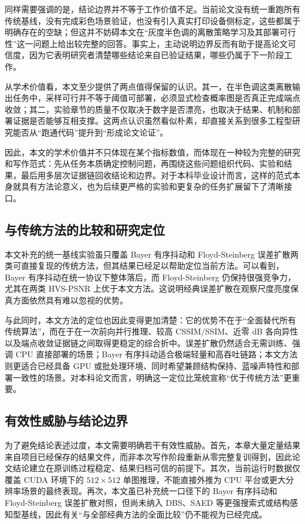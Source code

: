 \documentclass[thesis]{../zstucs-graduation-project}
\begin{document}
同样需要强调的是，结论边界并不等于工作价值不足。当前论文没有统一重跑所有传统基线，没有完成彩色场景验证，也没有引入真实打印设备侧标定，这些都属于明确存在的空缺；但这并不妨碍本文在“灰度半色调的离散策略学习及其部署可行性”这一问题上给出较完整的回答。事实上，主动说明边界反而有助于提高论文可信度，因为它表明研究者清楚哪些结论来自已验证结果，哪些仍属于下一阶段工作。

从学术价值看，本文至少提供了两点值得保留的认识。其一，在半色调这类离散输出任务中，采样可行并不等于阈值可部署，必须显式检查概率图是否真正完成端点收敛；其二，实验章节的质量不仅取决于数字是否漂亮，也取决于结果、机制和部署证据是否能够互相支撑。这两点认识虽然看似朴素，却直接关系到很多工程型研究能否从“跑通代码”提升到“形成论文论证”。

因此，本文的学术价值并不只体现在某个指标数值，而体现在一种较为完整的研究和写作范式：先从任务本质确定控制问题，再围绕这些问题组织代码、实验和结果，最后用多层次证据链回收结论和边界。对于本科毕业设计而言，这样的范式本身就具有方法论意义，也为后续更严格的实验和更复杂的任务扩展留下了清晰接口。

\subsection{与传统方法的比较和研究定位}
本文补充的统一基线实验虽只覆盖 Bayer 有序抖动和 Floyd-Steinberg 误差扩散两类可直接复现的传统方法，但其结果已经足以帮助定位当前方法。可以看到，Bayer 有序抖动在统一协议下整体落后，而 Floyd-Steinberg 仍保持很强竞争力，尤其在两类 HVS-PSNR 上优于本文方法。这说明经典误差扩散在观察尺度亮度保真方面依然具有难以忽视的优势。

与此同时，本文方法的定位也因此变得更加清楚：它的优势不在于“全面替代所有传统算法”，而在于在一次前向并行推理、较高 CSSIM/SSIM、近零 dB 各向异性以及端点收敛证据链之间取得更稳定的综合折中。误差扩散仍然适合无需训练、强调 CPU 直接部署的场景；Bayer 有序抖动适合极端轻量和高吞吐链路；本文方法则更适合已经具备 GPU 或批处理环境、同时希望兼顾结构保持、蓝噪声特性和部署一致性的场景。对本科论文而言，明确这一定位比笼统宣称“优于传统方法”更重要。

\subsection{有效性威胁与结论边界}
为了避免结论表述过度，本文需要明确若干有效性威胁。首先，本章大量定量结果来自项目已经保存的结果文件，而非本次写作阶段重新从零完整复训得到，因此论文结论建立在原训练过程稳定、结果归档可信的前提下。其次，当前运行时数据仅覆盖 CUDA 环境下的 $512\times512$ 单图推理，不能直接外推为 CPU 平台或更大分辨率场景的最终表现。再次，本文虽已补充统一口径下的 Bayer 有序抖动和 Floyd-Steinberg 误差扩散对照，但尚未纳入 DBS、SAED 等更强搜索式或结构感知型基线，因此有关“与全部经典方法的全面比较”仍不能视为已经完成。
\end{document}
